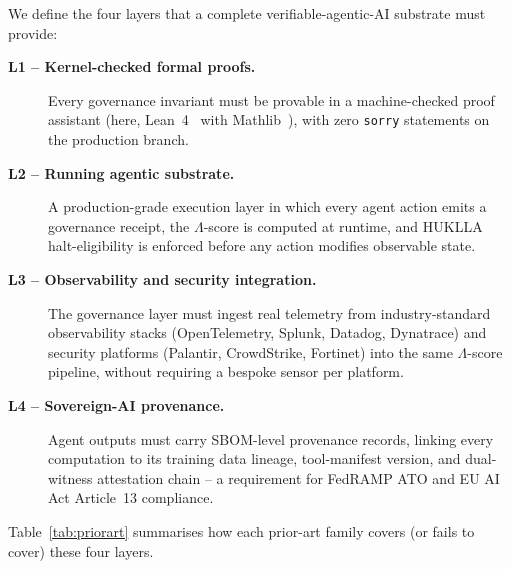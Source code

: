 We define the four layers that a complete verifiable-agentic-AI substrate
must provide:

\begin{description}
  \item[\textbf{L1 -- Kernel-checked formal proofs.}]
    Every governance invariant must be provable in a machine-checked
    proof assistant (here, Lean~4~\cite{moura2021lean4} with
    Mathlib~\cite{mathlib2020}), with zero \texttt{sorry} statements on
    the production branch.
  \item[\textbf{L2 -- Running agentic substrate.}]
    A production-grade execution layer in which every agent action emits a
    governance receipt, the \(\Lambda\)-score is computed at runtime, and
    HUKLLA halt-eligibility is enforced before any action modifies
    observable state.
  \item[\textbf{L3 -- Observability and security integration.}]
    The governance layer must ingest real telemetry from industry-standard
    observability stacks (OpenTelemetry, Splunk, Datadog, Dynatrace) and
    security platforms (Palantir, CrowdStrike, Fortinet) into the same
    \(\Lambda\)-score pipeline, without requiring a bespoke sensor per
    platform.
  \item[\textbf{L4 -- Sovereign-AI provenance.}]
    Agent outputs must carry SBOM-level provenance records, linking every
    computation to its training data lineage, tool-manifest version, and
    dual-witness attestation chain -- a requirement for FedRAMP ATO and
    EU AI Act Article~13 compliance.
\end{description}

Table~\ref{tab:priorart} summarises how each prior-art family covers
(or fails to cover) these four layers.

